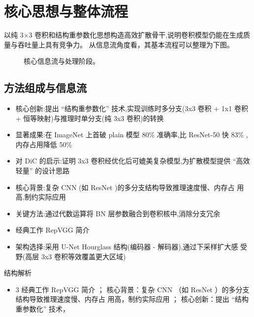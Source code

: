 \documentclass[UTF8,11pt,a4paper]{ctexart}
\begin{document}
\section{核心思想与整体流程}
以纯 3×3 卷积和结构重参数化思想构造高效扩散骨干,说明卷积模型仍能在生成质量与吞吐量上具有竞争力。 从信息流角度看，其基本流程可以整理为下图。

\begin{figure}[H]
\centering
{}
\caption{核心信息流与处理阶段。}
\end{figure}

\subsection{方法组成与信息流}
\begin{itemize}
\item 核心创新:提出 “结构重参数化” 技术,实现训练时多分支(3x3 卷积 + 1x1 卷积 + 恒等映射)与推理时单分支(纯 3x3 卷积)的转换
\item 显著成果:在 ImageNet 上首破 plain 模型 80\% 准确率,比 ResNet-50 快 83\% ,内存占用降低 50\%
\item 对 DiC 的启示:证明 3x3 卷积经优化后可媲美复杂模型,为扩散模型提供 “高效轻量” 的设计思路
\item 核心背景:复杂 CNN (如 ResNet )的多分支结构导致推理速度慢、内存占 用高,制约实际应用
\item 关键方法:通过代数运算将 BN 层参数融合到卷积核中,消除分支冗余
\item 经典工作 RepVGG 简介
\item 架构选择:采用 U-Net Hourglass 结构(编码器 - 解码器),通过下采样扩大感 受野(高层 3x3 卷积等效覆盖更大区域)
\end{itemize}

\begin{keybox}{结构解析}
\begin{itemize}
\item 3 经典工作 RepVGG 简介 ； 核心背景：复杂 CNN （如 ResNet ）的多分支结构导致推理速度慢、内存占 用高，制约实际应用 ； 核心创新：提出 “结构重参数化” 技术，
\end{itemize}
\end{keybox}
\end{document}

